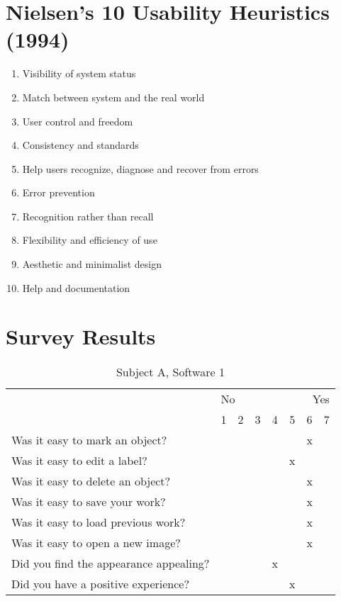 \documentclass[a4paper,11pt,oneside]{article}
\begin{document}
\section{Nielsen’s 10 Usability Heuristics (1994)}
\label{sec:n_rules}
\begin{enumerate}
\item Visibility of system status
\item Match between system and the real world
\item User control and freedom
\item Consistency and standards
\item Help users recognize, diagnose and recover from errors
\item Error prevention
\item Recognition rather than recall
\item Flexibility and efficiency of use
\item Aesthetic and minimalist design
\item Help and documentation
\end{enumerate}

\section{Survey Results}
\label{sec:survey}

\begin{table}[h]
\label{tab:a1}
\centering
\caption{Subject A, Software 1}

\vspace{10px}
\begin{tabular}{ p{7cm} | c | c | c | c | c | c | c | }
    \cline{2-8}
     & \multicolumn{3}{|l}{No} & \multicolumn{1}{c}{ } & \multicolumn{3}{r|}{Yes} \\
    \cline{2-8}
      & 1 & 2 & 3 & 4 & 5 & 6 & 7 \\
    \hline
    \multicolumn{1}{|l|}{Was it easy to mark an object?} & & & & & & x & \\
    \hline
    \multicolumn{1}{|l|}{Was it easy to edit a label?} & & & & & x & & \\
    \hline
    \multicolumn{1}{|l|}{Was it easy to delete an object?} & & & & & & x & \\
    \hline
    \multicolumn{1}{|l|}{Was it easy to save your work?} & & & & & & x & \\
    \hline
    \multicolumn{1}{|l|}{Was it easy to load previous work?} & & & & & & x & \\
    \hline
    \multicolumn{1}{|l|}{Was it easy to open a new image?} & & & & & & x & \\
    \hline
    \multicolumn{1}{|l|}{Did you find the appearance appealing?} & & & & x & & & \\
    \hline
    \multicolumn{1}{|l|}{Did you have a positive experience?} & & & & & x & & \\
    \hline
\end{tabular} 
\end{table}
\end{document}
